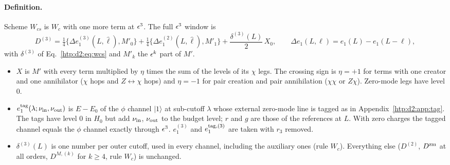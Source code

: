 \paragraph{Definition.} Scheme $W_{cs}$ is $W_c$ with one more term at $\epsilon^3$. The full $\epsilon^3$ window is
\begin{equation}
 D^{(3)}=\tfrac14\big\{\Delta e_1^{(3)}(L,\hat\ell),M'_0\big\}+\tfrac14\big\{\Delta e_1^{(2)}(L,\hat\ell),M'_1\big\}+\frac{\delta^{(3)}(L)}2\,X_0,
 \qquad \Delta e_1(L,\ell)=e_1(L)-e_1(L-\ell),
 \label{htp:d2:eq:wcsfull}
\end{equation}
with $\delta^{(3)}$ of Eq.~\eqref{htp:d2:eq:wcs} and $M'_k$ the $\epsilon^k$ part of $M'$.
\begin{itemize}
\item $X$ is $M'$ with every term multiplied by $\eta$ times the sum of the levels of its $\chi$ legs. The crossing sign is
 $\eta=+1$ for terms with one creator and one annihilator ($\chi$ hops and $Z\leftrightarrow\chi$ hops) and $\eta=-1$ for pair
 creation and pair annihilation ($\chi\chi$ or $Z\chi$). Zero-mode legs have level 0.
\item $e_1^{\rm tag}(\lambda;\nu_{\rm in},\nu_{\rm out})$ is $E-E_0$ of the $\phi$ channel $|1\rangle$ at sub-cutoff $\lambda$
 whose external zero-mode line is tagged as in Appendix~\ref{htp:d2:app:tag}. The tags have level 0 in $H_0$ but add
 $\nu_{\rm in}$, $\nu_{\rm out}$ to the budget level; $r$ and $g$ are those of the references at $L$. With zero charges the
 tagged channel equals the $\phi$ channel exactly through $\epsilon^3$. $e_1^{(3)}$ and $e_1^{{\rm tag},(3)}$ are taken with $r_3$
 removed.
\item $\delta^{(3)}(L)$ is one number per outer cutoff, used in every channel, including the auxiliary ones (rule $W_c$).
 Everything else ($D^{(2)}$, $D^{\rm zm}$ at all orders, $D^{M,(k)}$ for $k\ge4$, rule $W_c$) is unchanged.
\end{itemize}

